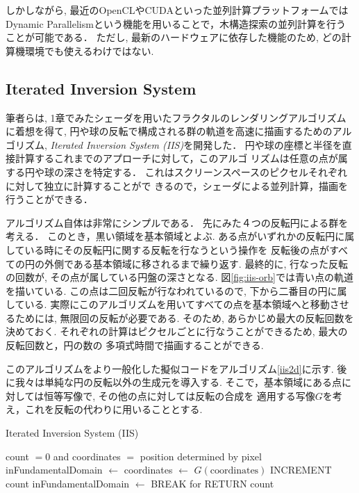 しかしながら, 最近のOpenCLやCUDAといった並列計算プラットフォームでは
Dynamic Parallelismという機能を用いることで，木構造探索の並列計算を行う
ことが可能である．
ただし, 最新のハードウェアに依存した機能のため, どの計算機環境でも使えるわけではない.

\subsection{Iterated Inversion System}

筆者らは, 1章でみたシェーダを用いたフラクタルのレンダリングアルゴリズム
に着想を得て, 円や球の反転で構成される群の軌道を高速に描画するためのアル
ゴリズム, \textit{Iterated Inversion System (IIS)}\cite{iis}を開発した．
円や球の座標と半径を直接計算するこれまでのアプローチに対して，このアルゴ
リズムは任意の点が属する円や球の深さを特定する．
これはスクリーンスペースのピクセルそれぞれに対して独立に計算することがで
きるので，シェーダによる並列計算，描画を行うことができる．

アルゴリズム自体は非常にシンプルである．
先にみた４つの反転円による群を考える．
このとき，黒い領域を基本領域とよぶ.
ある点がいずれかの反転円に属している時にその反転円に関する反転を行なうという操作を
反転後の点がすべての円の外側である基本領域に移されるまで繰り返す.
最終的に, 行なった反転の回数が, その点が属している円盤の深さとなる.
図\ref{fig:iis-orb}では青い点の軌道を描いている.
この点は二回反転が行なわれているので, 下から二番目の円に属している.
実際にこのアルゴリズムを用いてすべての点を基本領域へと移動させるためには,
無限回の反転が必要である. そのため, あらかじめ最大の反転回数を決めておく.
それぞれの計算はピクセルごとに行なうことができるため, 最大の反転回数と，円の数の
多項式時間で描画することができる.

このアルゴリズムをより一般化した擬似コードをアルゴリズム\ref{iis2d}に示す.
後に我々は単純な円の反転以外の生成元を導入する.
そこで，基本領域にある点に対しては恒等写像で, その他の点に対しては反転の合成を
適用する写像$G$を考え，これを反転の代わりに用いることとする.

 \begin{algorithm}
  \caption{Iterated Inversion System (IIS)}
  \label{iis2d}
  \begin{algorithmic}
   \REQUIRE count $= 0$ and coordinates $=$ position determined by
   pixel
   \STATE inFundamentalDomain $\leftarrow$ \TRUE
   \STATE coordinates $\leftarrow$ $G(\text{coordinates})$
   \STATE INCREMENT count
   \STATE inFundamentalDomain $\leftarrow$ \FALSE
   \ENDIF
   \ENDFOR
   \STATE BREAK for
   \ENDIF
   \ENDFOR
   \STATE RETURN count
  \end{algorithmic}
 \end{algorithm}

